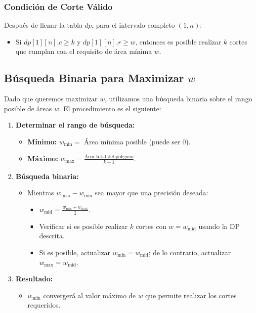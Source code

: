 \documentclass{article}
\begin{document}
\subsubsection{Condición de Corte Válido}

Después de llenar la tabla \( dp \), para el intervalo completo \( (1, n) \):

\begin{itemize}
    \item Si \( dp[1][n].c \geq k \) y \( dp[1][n].r \geq w \), entonces es posible realizar \( k \) cortes que cumplan con el requisito de área mínima \( w \).
\end{itemize}

\subsection{Búsqueda Binaria para Maximizar \( w \)}

Dado que queremos maximizar \( w \), utilizamos una búsqueda binaria sobre el rango posible de áreas \( w \). El procedimiento es el siguiente:

\begin{enumerate}
    \item \textbf{Determinar el rango de búsqueda:}
    \begin{itemize}
        \item \textbf{Mínimo:} \( w_{\text{min}} = \) Área mínima posible (puede ser 0).
        \item \textbf{Máximo:} \( w_{\text{max}} = \frac{\text{Área total del polígono}}{k+1} \).
    \end{itemize}
    \item \textbf{Búsqueda binaria:}
    \begin{itemize}
        \item Mientras \( w_{\text{max}} - w_{\text{min}} \) sea mayor que una precisión deseada:
        \begin{itemize}
            \item \( w_{\text{mid}} = \frac{w_{\text{min}} + w_{\text{max}}}{2} \).
            \item Verificar si es posible realizar \( k \) cortes con \( w = w_{\text{mid}} \) usando la DP descrita.
            \item Si es posible, actualizar \( w_{\text{min}} = w_{\text{mid}} \); de lo contrario, actualizar \( w_{\text{max}} = w_{\text{mid}} \).
        \end{itemize}
    \end{itemize}
    \item \textbf{Resultado:}
    \begin{itemize}
        \item \( w_{\text{min}} \) convergerá al valor máximo de \( w \) que permite realizar los cortes requeridos.
    \end{itemize}
\end{enumerate}
\end{document}
